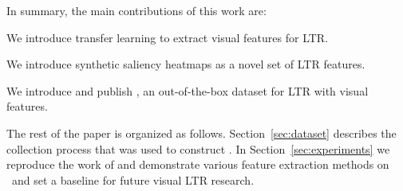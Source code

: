 In summary, the main contributions of this work are:
\begin{inparaenum}[(i)]
\item We introduce transfer learning to extract visual features for \ac{LTR}.
\item We introduce synthetic saliency heatmaps as a novel set of \ac{LTR} features.
\item We introduce and publish \datasetname, an out-of-the-box dataset for \ac{LTR} with visual features.
\end{inparaenum}


 The rest of the paper is organized as follows. Section~\ref{sec:dataset} describes the collection process that was used to construct \datasetname. In Section~\ref{sec:experiments} we reproduce the work of \citet{fan2017learning} and demonstrate various feature extraction methods on \datasetname~and set a baseline for future visual \ac{LTR} research.  
\fi